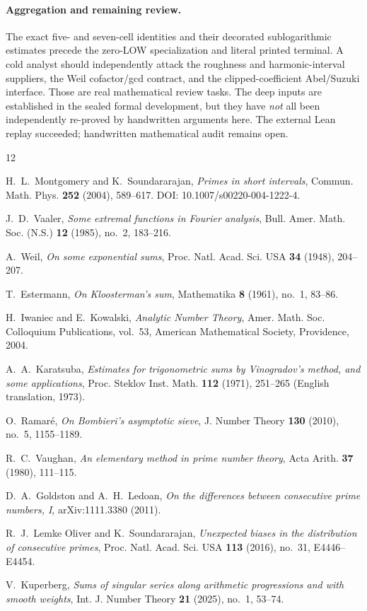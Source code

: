 \documentclass[11pt]{article}
\theoremstyle{definition}
\theoremstyle{remark}
\newcommand{\1}{\mathbf 1}
\begin{document}
\paragraph{Aggregation and remaining review.}
The exact five- and seven-cell identities and their decorated
sublogarithmic estimates precede the zero-LOW specialization and
literal printed terminal. A cold analyst should independently attack
the roughness and harmonic-interval suppliers, the Weil cofactor/gcd
contract, and the clipped-coefficient Abel/Suzuki interface. Those
are real mathematical review tasks. The deep inputs are established
in the sealed formal development, but they have \emph{not} all been
independently re-proved by handwritten arguments here. The external
Lean replay succeeded; handwritten mathematical audit remains open.


\begingroup
\small
\begin{thebibliography}{12}
\setlength{\itemsep}{1pt}

H.~L.~Montgomery and K.~Soundararajan,
\emph{Primes in short intervals},
Commun. Math. Phys. \textbf{252} (2004), 589--617.
DOI: 10.1007/s00220-004-1222-4.

J.~D.~Vaaler,
\emph{Some extremal functions in Fourier analysis},
Bull. Amer. Math. Soc. (N.S.) \textbf{12} (1985), no.~2, 183--216.

A.~Weil,
\emph{On some exponential sums},
Proc. Natl. Acad. Sci. USA \textbf{34} (1948), 204--207.

T.~Estermann,
\emph{On Kloosterman's sum},
Mathematika \textbf{8} (1961), no.~1, 83--86.

H.~Iwaniec and E.~Kowalski,
\emph{Analytic Number Theory},
Amer. Math. Soc. Colloquium Publications, vol.~53,
American Mathematical Society, Providence, 2004.

A.~A.~Karatsuba,
\emph{Estimates for trigonometric sums by Vinogradov's method,
and some applications},
Proc. Steklov Inst. Math. \textbf{112} (1971), 251--265
(English translation, 1973).

O.~Ramar\'e,
\emph{On Bombieri's asymptotic sieve},
J. Number Theory \textbf{130} (2010), no.~5, 1155--1189.

R.~C.~Vaughan,
\emph{An elementary method in prime number theory},
Acta Arith. \textbf{37} (1980), 111--115.

D.~A.~Goldston and A.~H.~Ledoan,
\emph{On the differences between consecutive prime numbers, I},
arXiv:1111.3380 (2011).

R.~J.~Lemke Oliver and K.~Soundararajan,
\emph{Unexpected biases in the distribution of consecutive primes},
Proc. Natl. Acad. Sci. USA \textbf{113} (2016),
no.~31, E4446--E4454.

V.~Kuperberg,
\emph{Sums of singular series along arithmetic progressions
and with smooth weights},
Int. J. Number Theory \textbf{21} (2025), no.~1, 53--74.

\end{thebibliography}
\endgroup
\end{document}

